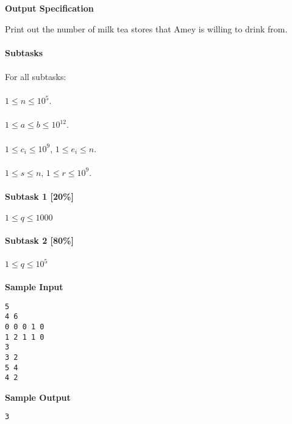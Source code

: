 \documentclass[]{article}
\begin{document}
\textbf{\large Output Specification}
\par
Print out the number of milk tea stores that Amey is willing to drink from. 
\\\\

\textbf{\large Subtasks}
\\\\
For all subtasks:
\\\\
$1 \le n \le 10^5$.
\\\\
$1 \le a \le b \le 10^{12}$.
\\\\
$1 \le c_i \le 10^9$, $1 \le e_i \le n$.
\\\\
$1 \le s \le n$, $1 \le r \le 10^9$.
\\\\
\textbf{Subtask 1 [20\%]}
\\\\
$1 \le q \le 1000$
\\\\
\textbf{Subtask 2 [80\%]}
\\\\
$1 \le q \le 10^5$
\\\\
\textbf{\large Sample Input}
\begin{verbatim}
5
4 6
0 0 0 1 0
1 2 1 1 0
3
3 2
5 4
4 2
\end{verbatim}
\textbf{\large Sample Output}
\begin{verbatim}
3
\end{verbatim}

\thispagestyle{empty}
\end{document}
